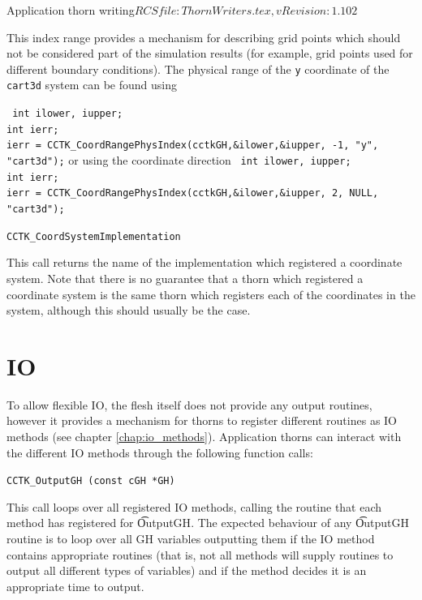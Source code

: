 \begin{cactuspart}{2}{Application thorn writing}{$RCSfile: ThornWriters.tex,v $}{$Revision: 1.102 $}
\begin{Lentry}
This index range provides a mechanism for describing
grid points which should not be considered part of the simulation results (for example,
grid points used for different boundary conditions). The physical range of the
{\tt y} coordinate of the {\tt cart3d} system can be found using

{\tt
int ilower, iupper;\\
int ierr;\\
ierr = CCTK\_CoordRangePhysIndex(cctkGH,\&ilower,\&iupper, -1, "y", "cart3d");}
or using the coordinate direction
{\tt
int ilower, iupper;\\
int ierr;\\
ierr = CCTK\_CoordRangePhysIndex(cctkGH,\&ilower,\&iupper, 2, NULL, "cart3d");}

\item[{\tt CCTK\_CoordSystemImplementation}]

This call returns the name of the implementation which registered a coordinate system.
Note that there is no guarantee that a thorn which registered a coordinate system is
the same thorn which registers each of the coordinates in the system, although this
should usually be the case.

\end{Lentry}


\section{IO}
\label{sec:io}

To allow flexible IO, the flesh itself does not provide any output
routines, however it provides a mechanism for thorns to register
different routines as IO methods (see chapter \ref{chap:io_methods}).
Application thorns can interact with the different IO methods through
the following function calls:

\begin{Lentry}

\item[{\tt CCTK\_OutputGH (const cGH *GH)}]

This call loops over all registered IO methods, calling the routine
that each method has registered for {\t OutputGH}.  The expected
behaviour of any {\t OutputGH} routine is to loop over all GH
variables outputting them if the IO method contains appropriate
routines (that is, not all methods will supply routines to output all
different types of variables) and if the method decides it is an
appropriate time to output.


\end{Lentry}
\end{cactuspart}
